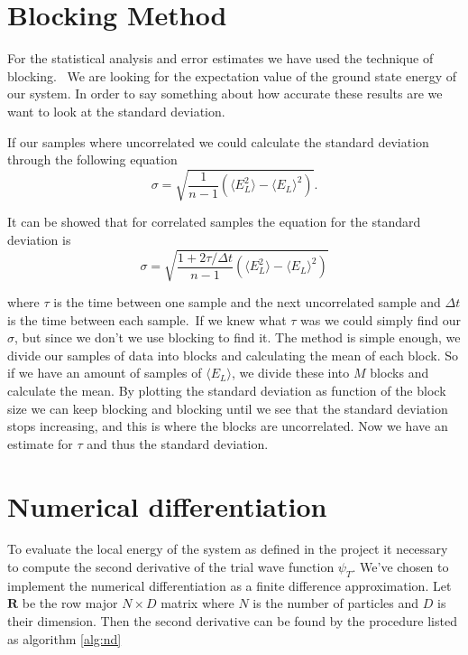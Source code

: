 \section{Blocking Method}

For the statistical analysis and error estimates we have used the technique of blocking. \
We are looking for the expectation value of the ground state energy of our system. In order to say something about how accurate these results are we want to look at the standard deviation. 

If our samples where uncorrelated we could calculate the standard deviation through the following equation 
$$\sigma = \sqrt{\frac{1}{n - 1} \left(\langle E_L^2\rangle - \langle E_L \rangle^2\right)}.$$

It can be showed that for correlated samples the equation for the standard deviation is
$$\sigma = \sqrt{\frac{1 + 2 \tau / \Delta t}{n - 1} \left(\langle E_L^2\rangle - \langle E_L \rangle^2\right)}$$

where $\tau$ is the time between one sample and the next uncorrelated sample and $\Delta t$ is the time between each sample.\
If we knew what $\tau$ was we could simply find our $\sigma$, but since we don't we use blocking to find it. The method is simple enough, we divide our samples of data into blocks and calculating the mean of each block. So if we have an amount of samples of $\langle E_L \rangle$, we divide these into $M$ blocks and calculate the mean. By plotting the standard deviation as function of the block size we can keep blocking and blocking until we see that the standard deviation stops increasing, and this is where the blocks are uncorrelated. Now we have an estimate for $\tau$ and thus the standard deviation.


\section{Numerical differentiation}
To evaluate the local energy of the system as defined in the project it necessary to compute the second derivative of the trial wave function $\psi_T$. We've chosen to implement the numerical differentiation as a finite difference approximation. Let $\mathbf{R}$ be the row major $N \times D$ matrix where $N$ is the number of particles and $D$ is their dimension. Then the second derivative can be found by the procedure listed as algorithm \ref{alg:nd}

